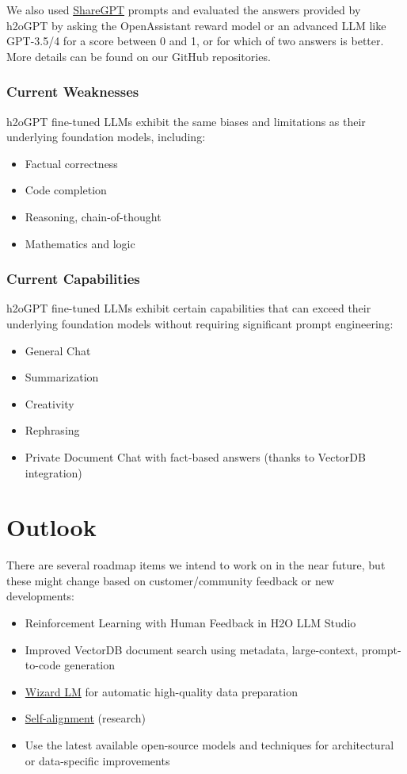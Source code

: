 \documentclass{article}
\begin{document}
We also used \href{https://sharegpt.com/}{ShareGPT} prompts and evaluated the answers provided by h2oGPT by asking the OpenAssistant reward model or an advanced LLM like GPT-3.5/4 for a score between 0 and 1, or for which of two answers is better. More details can be found on our GitHub repositories.

\subsubsection{Current Weaknesses}
h2oGPT fine-tuned LLMs exhibit the same biases and limitations as their underlying foundation models, including:

\begin{itemize}
    \item Factual correctness
    \item Code completion
    \item Reasoning, chain-of-thought
    \item Mathematics and logic
\end{itemize}

\subsubsection{Current Capabilities}
h2oGPT fine-tuned LLMs exhibit certain capabilities that can exceed their underlying foundation models without requiring significant prompt engineering:
\begin{itemize}
\item General Chat
\item Summarization
\item Creativity
\item Rephrasing
\item Private Document Chat with fact-based answers (thanks to VectorDB integration)
\end{itemize}



\section{Outlook}
There are several roadmap items we intend to work on in the near future, but these might change based on customer/community feedback or new developments:
\begin{itemize}
    \item Reinforcement Learning with Human Feedback in H2O LLM Studio
    \item Improved VectorDB document search using metadata, large-context, prompt-to-code generation
    \item \href{https://arxiv.org/abs/2304.12244}{Wizard LM} for automatic high-quality data preparation
    \item \href{https://arxiv.org/abs/2305.03047}{Self-alignment} (research)
    \item Use the latest available open-source models and techniques for architectural or data-specific improvements
\end{itemize}
\end{document}
